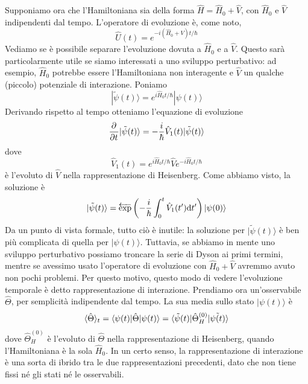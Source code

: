 \documentclass[a4paper, 11pt]{article}
\newcommand{\ham}{\hat{H}}
\renewcommand{\U}{\hat{U}}
\renewcommand{\ket}[1]{| #1\rangle}
\begin{document}
Supponiamo ora che l'Hamiltoniana sia della forma $\ham=\ham_0+\hat{V}$, con $\ham_0$ e $\hat{V}$ indipendenti dal tempo. L'operatore di evoluzione è, come noto,
\[\U(t)=e^{-i(\ham_0+V)t/\hbar}\]
Vediamo se è possibile separare l'evoluzione dovuta a $\ham_0$ e a $\hat{V}$. Questo sarà particolarmente utile se siamo interessati a uno sviluppo perturbativo: ad esempio, $\ham_0$ potrebbe essere l'Hamiltoniana non interagente e $\hat{V}$ un qualche (piccolo) potenziale di interazione. Poniamo
\[|{\tilde{\psi}(t)}\rangle=e^{i\ham_0t/\hbar}\ket{\psi(t)}\]
Derivando rispetto al tempo otteniamo l'equazione di evoluzione
\[\dfrac{\partial ^{}}{\partial {t}^{}}|\tilde{\psi}(t)\rangle=-\frac{i}{\hbar}\hat{V}_1(t)|\tilde{\psi}(t)\rangle\]
dove
\[\hat{V}_1(t)=e^{i\ham_0t/\hbar}\hat{V}e^{-i\ham_0t/\hbar}\]
è l'evoluto di $\hat{V}$ nella rappresentazione di Heisenberg. Come abbiamo visto, la soluzione è 
\[|\tilde{\psi}(t)\rangle=\overleftarrow{\exp}\left(-\frac{i}{\hbar}\int_{0}^{t}\hat{V}_1(t')\d t'\right)\ket{\psi(0)}\]
Da un punto di vista formale, tutto ciò è inutile: la soluzione per $|\tilde{\psi}(t)\rangle$ è ben più complicata di quella per $\ket{\psi(t)}$. Tuttavia, se abbiamo in mente uno sviluppo perturbativo possiamo troncare la serie di Dyson ai primi termini, mentre se avessimo usato l'operatore di evoluzione con $\ham_0+\hat{V}$ avremmo avuto non pochi problemi. Per questo motivo, questo modo di vedere l'evoluzione temporale è detto rappresentazione di interazione. Prendiamo ora un'osservabile $\hat{\Theta}$, per semplicità indipendente dal tempo. La sua media sullo stato $\ket{\psi(t)}$ è
\begin{align*}
	\langle\hat{\Theta}\rangle_t=\langle\psi(t)|\hat{\Theta}|\psi(t)\rangle=\langle\tilde{\psi}(t)|\hat{\Theta}^{(0)}_H|\tilde{\psi(t)}\rangle
\end{align*}
dove $\hat{\Theta}^{(0)}_H$ è l'evoluto di $\hat{\Theta}$ nella rappresentazione di Heisenberg, quando l'Hamiltoniana è la sola $\ham_0$. In un certo senso, la rappresentazione di interazione è una sorta di ibrido tra le due rappresentazioni precedenti, dato che non tiene fissi né gli stati né le osservabili.
\end{document}
